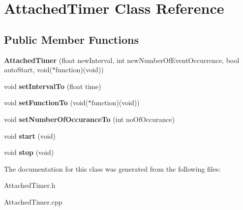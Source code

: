 \hypertarget{class_attached_timer}{
\section{AttachedTimer Class Reference}
\label{class_attached_timer}
}
\subsection*{Public Member Functions}
\begin{DoxyCompactItemize}
\item 
\hypertarget{class_attached_timer_a2d171eac4e4a3f46b796aa880ed1cf33}{
{\bfseries AttachedTimer} (float newInterval, int newNumberOfEventOccurrence, bool autoStart, void($\ast$function)(void))}
\label{class_attached_timer_a2d171eac4e4a3f46b796aa880ed1cf33}

\item 
\hypertarget{class_attached_timer_a206bf96d1b657b8a754d95d366b7607c}{
void {\bfseries setIntervalTo} (float time)}
\label{class_attached_timer_a206bf96d1b657b8a754d95d366b7607c}

\item 
\hypertarget{class_attached_timer_a7c55a3c2b429a3c57e54449d6bc233d7}{
void {\bfseries setFunctionTo} (void($\ast$function)(void))}
\label{class_attached_timer_a7c55a3c2b429a3c57e54449d6bc233d7}

\item 
\hypertarget{class_attached_timer_a4dcf53b27c1f28af45180ed559367aae}{
void {\bfseries setNumberOfOccuranceTo} (int noOfOccurance)}
\label{class_attached_timer_a4dcf53b27c1f28af45180ed559367aae}

\item 
\hypertarget{class_attached_timer_ac700b7a386e134ea095f215f9f87751d}{
void {\bfseries start} (void)}
\label{class_attached_timer_ac700b7a386e134ea095f215f9f87751d}

\item 
\hypertarget{class_attached_timer_ab7695cdc447097003c1772ad36d8e88c}{
void {\bfseries stop} (void)}
\label{class_attached_timer_ab7695cdc447097003c1772ad36d8e88c}

\end{DoxyCompactItemize}


The documentation for this class was generated from the following files:\begin{DoxyCompactItemize}
\item 
AttachedTimer.h\item 
AttachedTimer.cpp\end{DoxyCompactItemize}
